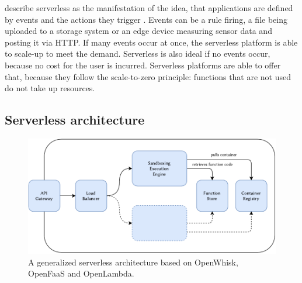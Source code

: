 \citeauthor{McGrath2017} describe serverless as the manifestation of the idea, that applications are defined by events and the actions they trigger \cite{McGrath2017}. Events can be a rule firing, a file being uploaded to a storage system or an edge device measuring sensor data and posting it via HTTP. If many events occur at once, the serverless platform is able to scale-up to meet the demand. Serverless is also ideal if no events occur, because no cost for the user is incurred. Serverless platforms are able to offer that, because they follow the scale-to-zero principle: functions that are not used do not take up resources.

\subsection{Serverless architecture}

\begin{figure}
    \includegraphics{figures/ServerlessArchitecture.pdf}
    \caption{A generalized serverless architecture based on OpenWhisk, OpenFaaS and OpenLambda.}
    \label{fig:serverless-architecture}
\end{figure}


